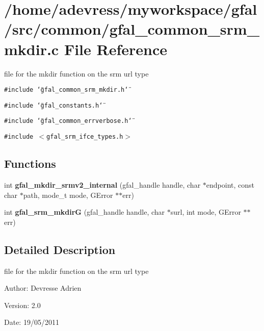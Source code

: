 \section{/home/adevress/myworkspace/gfal/src/common/gfal\_\-common\_\-srm\_\-mkdir.c File Reference}
\label{gfal__common__srm__mkdir_8c}
file for the mkdir function on the srm url type 

{\tt \#include \char`\"{}gfal\_\-common\_\-srm\_\-mkdir.h\char`\"{}}\par
{\tt \#include \char`\"{}gfal\_\-constants.h\char`\"{}}\par
{\tt \#include \char`\"{}gfal\_\-common\_\-errverbose.h\char`\"{}}\par
{\tt \#include $<$gfal\_\-srm\_\-ifce\_\-types.h$>$}\par
\subsection*{Functions}
\begin{CompactItemize}
\item 
int \textbf{gfal\_\-mkdir\_\-srmv2\_\-internal} (gfal\_\-handle handle, char $\ast$endpoint, const char $\ast$path, mode\_\-t mode, GError $\ast$$\ast$err)\label{gfal__common__srm__mkdir_8c_da43b13d5c3fe65b5dcadd8daff2bafe}

\item 
int \textbf{gfal\_\-srm\_\-mkdir\-G} (gfal\_\-handle handle, char $\ast$surl, int mode, GError $\ast$$\ast$err)\label{gfal__common__srm__mkdir_8c_b7f321a0f5aea284d6c711e0b88749e3}

\end{CompactItemize}


\subsection{Detailed Description}
file for the mkdir function on the srm url type 

\begin{Desc}
\item[Author:]Devresse Adrien \end{Desc}
\begin{Desc}
\item[Version:]2.0 \end{Desc}
\begin{Desc}
\item[Date:]19/05/2011 \end{Desc}
